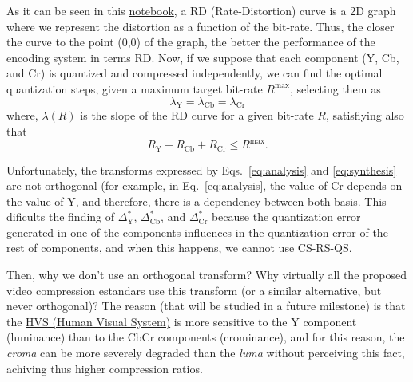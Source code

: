 As it can be seen in this
\href{https://github.com/Sistemas-Multimedia/Sistemas-Multimedia.github.io/blob/master/study_guide/06-color_transform/performance.ipynb}{notebook},
a RD (Rate-Distortion) curve is a 2D graph where we represent the
distortion as a function of the bit-rate. Thus, the closer the curve
to the point (0,0) of the graph, the better the performance of the
encoding system in terms RD. Now, if we suppose that each component
(Y, Cb, and Cr) is quantized and compressed independently, we can
find the optimal quantization steps, given a maximum target bit-rate
$R^{\text{max}}$, selecting them as
\begin{equation}
  \lambda_{\text{Y}} = \lambda_{\text{Cb}} = \lambda_{\text{Cr}}
\end{equation}
where, $\lambda(R)$ is the slope of the RD curve for a given bit-rate
$R$, satisfiying also that
\begin{equation}
  R_{\text{Y}} + R_{\text{Cb}} + R_{\text{Cr}} \le R^{\text{max}}.
\end{equation}

Unfortunately, the transforms expressed by Eqs.~\ref{eq:analysis} and
\ref{eq:synthesis} are not orthogonal (for example, in
Eq.~\ref{eq:analysis}, the value of Cr depends on the value of Y, and
therefore, there is a dependency between both basis. This dificults
the finding of $\Delta^*_{\text{Y}}$, $\Delta^*_{\text{Cb}}$, and
$\Delta^*_{\text{Cr}}$ because the quantization
error generated in one of the components influences in the
quantization error of the rest of components, and when this happens,
we cannot use CS-RS-QS.

\begin{comment}
The International Consultative Committee for Radio (CCIR)11 Recommendation 601:
\begin{equation}
\begin{array}
Y ′= 219(+0.299R′ + 0.587G′ + 0.114B′) + 16 \\
CB′= 224(-0.169R′ - 0.331G′ + 0.500B′) + 128 \\
CR′= 224(+0.500R′ - 0.419G′ - 0.081B′) + 128
\end{array}
\end{equation}

0.299*(−0.169) + 0.587*(−0.331) + 0.114*0.500 = -.187828

(-0.169)*0.500 + (-0.331)*(-0.419) + 0.500*(-0.081) = .013689
\end{comment}

Then, why we don't use an orthogonal transform? Why virtually all the
proposed video compression estandars use this transform (or a similar
alternative, but never orthogonal)? The reason (that will be studied
in a future milestone) is that the
\href{https://en.wikipedia.org/wiki/Visual_system}{HVS (Human Visual
  System)} is more sensitive to the Y component (luminance) than to
the CbCr components (crominance), and for this reason, the
\emph{croma} can be more severely degraded than the \emph{luma}
without perceiving this fact, achiving thus higher compression ratios.

